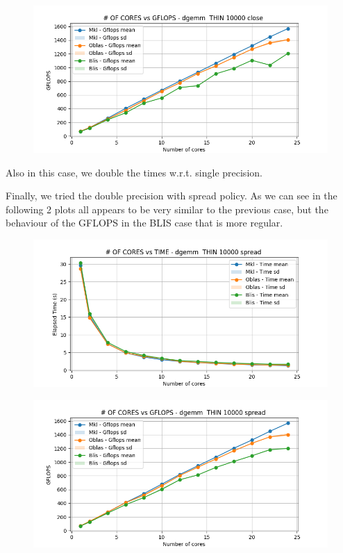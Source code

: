 \documentclass{article}
\begin{document}
\begin{figure}[H]
    \centering
    \includegraphics[width=\textwidth]{THIN scalability/dgemm__THIN_10000_close_gflops.png}
\end{figure}

Also in this case, we double the times w.r.t. single precision.

Finally, we tried the double precision with spread policy. As we can see in the following 2 plots all appears to be very similar to the previous case, but the behaviour of the GFLOPS in the BLIS case that is more regular.
\begin{figure}[H]
    \centering
    \includegraphics[width=\textwidth]{THIN scalability/dgemm__THIN_10000_spread_time.png}
\end{figure}

\begin{figure}[H]
    \centering
    \includegraphics[width=\textwidth]{THIN scalability/dgemm__THIN_10000_spread_gflops.png}
\end{figure}
\end{document}
